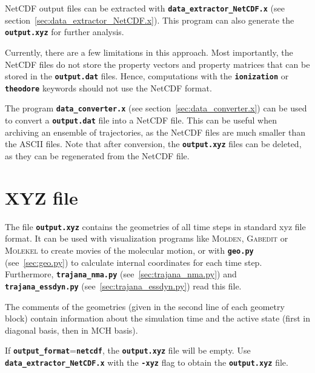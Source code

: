 \documentclass[a4paper,10pt,DIV=15,openany]{scrbook}
\newcommand{\ttt}[1]{\textbf{\texttt{#1}}}
\begin{document}
NetCDF output files can be extracted with \ttt{data\_extractor\_NetCDF.x} (see section~\ref{sec:data_extractor_NetCDF.x}).
This program can also generate the \ttt{output.xyz} for further analysis.

Currently, there are a few limitations in this approach.
Most importantly, the NetCDF files do not store the property vectors and property matrices that can be stored in the \ttt{output.dat} files.
Hence, computations with the \ttt{ionization} or \ttt{theodore} keywords should not use the NetCDF format.



The program \ttt{data\_converter.x} (see section~\ref{sec:data_converter.x}) can be used to convert a \ttt{output.dat} file into a NetCDF file.
This can be useful when archiving an ensemble of trajectories, as the NetCDF files are much smaller than the ASCII files.
Note that after conversion, the \ttt{output.xyz} files can be deleted, as they can be regenerated from the NetCDF file.




\section{XYZ file}\label{sec:xyzfile}

The file \ttt{output.xyz} contains the geometries of all time steps in standard xyz file format. It can be used with visualization programs like \textsc{Molden}, \textsc{Gabedit} or \textsc{Molekel} to create movies of the molecular motion, or with \ttt{geo.py} (see~\ref{sec:geo.py}) to calculate internal coordinates for each time step. Furthermore, \ttt{trajana\_nma.py} (see~\ref{sec:trajana_nma.py}) and \ttt{trajana\_essdyn.py} (see~\ref{sec:trajana_essdyn.py}) read this file.

The comments of the geometries (given in the second line of each geometry block) contain information about the simulation time and the active state (first in diagonal basis, then in MCH basis).

If  \ttt{output\_format}=\ttt{netcdf}, the \ttt{output.xyz} file will be empty.
Use \ttt{data\_extractor\_NetCDF.x} with the \ttt{-xyz} flag to obtain the \ttt{output.xyz} file.


\end{document}
